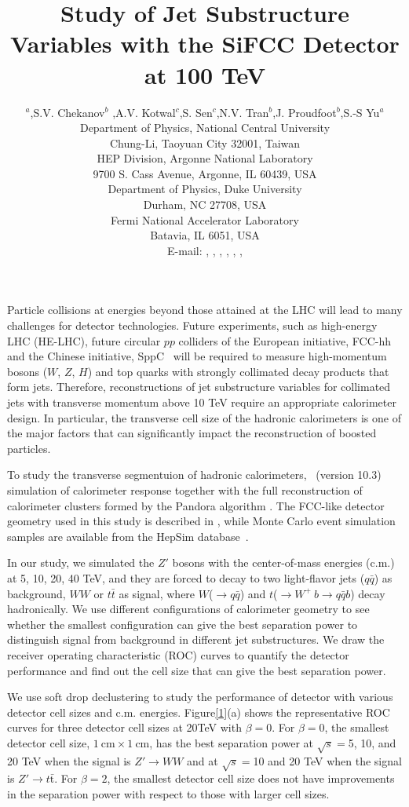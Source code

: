 \documentclass[a4paper]{PoS}
\title{Study of Jet Substructure Variables with the SiFCC Detector at 100 TeV}
\author{\speaker{Chih-Hsiang Yeh}$^a$,S.V. Chekanov$^b$ ,A.V. Kotwal$^{c}$,S. Sen$^{c}$,N.V. Tran$^{b}$,J. Proudfoot$^{b}$,S.-S Yu$^{a}$\\     
     \llap{$^a$}Department of Physics, National Central University\\
     Chung-Li, Taoyuan City 32001, Taiwan\\
     \llap{$^b$}HEP Division, Argonne National Laboratory\\
     9700 S. Cass Avenue, Argonne, IL 60439, USA\\
     \llap{$^c$}Department of Physics, Duke University\\
     Durham, NC 27708, USA\\
     \llap{$^d$}Fermi National Accelerator Laboratory\\
     Batavia, IL 6051, USA\\
     E-mail:  \email{a9510130375@gmail.com},
     \email{chekanov@anl.gov},
     \email{kotwal@phy.duke.edu},
     \email{sourav.sen@duke.edu},
     \email{ntran@fnal.gov},
     \email{proudfoot@anl.gov},
     \email{syu@phy.ncu.edu.tw}}
\begin{document}
Particle collisions at energies  beyond those attained at the LHC will lead to many 
challenges for detector technologies.
Future experiments, such as high-energy LHC (HE-LHC),
future circular $pp$ colliders of the European initiative, FCC-hh~\cite{Benedikt:2206376} and the Chinese initiative, SppC~\cite{Tang:2015qga} will be required to measure high-momentum bosons ($W$, $Z$, $H$) and top quarks with strongly
collimated decay products that form jets.  
Therefore, reconstructions of jet substructure  variables for collimated jets with transverse 
momentum above 10 TeV
require an appropriate calorimeter design.  In particular, the transverse cell size of the hadronic 
calorimeters is one of the major factors that can significantly impact 
the reconstruction of boosted particles.

To study the transverse segmentuion of hadronic calorimeters,
\GEANTfour\ (version 10.3)~\cite{Allison:2016} simulation of calorimeter response together
with
the full reconstruction of calorimeter clusters formed by the Pandora algorithm \cite{Marshall:2013}.
The FCC-like detector geometry used in this study is described in  \cite{Chekanov:2016ppq},
while Monte Carlo event simulation samples are available from the
HepSim database~\cite{Chekanov:2014fga}.


In our study, we simulated the $Z'$ bosons with the center-of-mass energies (c.m.) at 5, 10, 20, 40 TeV, and they are forced to decay to two light-flavor jets ($q\bar{q}$) as background, $W W$ or $t\bar{t}$ as signal, where $W$($\rightarrow$$q\bar{q}$) and $t$($ \rightarrow  W^+\>b \rightarrow q\bar{q} b$) decay hadronically. We use different configurations of calorimeter geometry to see whether the smallest configuration can give the best separation power to distinguish signal from background in different jet substructures. We draw the receiver operating characteristic (ROC) curves to quantify the detector performance and find out the cell size that can give the best separation power.

We use soft drop declustering\cite{Larkoski:2014wba} to study the performance of detector with various detector cell sizes and c.m. energies. Figure\ref{1}(a) shows the representative ROC curves for three detector cell sizes at 20TeV with $\beta=0$. For $\beta=0$, the smallest detector cell size, $1~\mathrm{cm}\times1~\mathrm{cm}$, has the best separation power at $\sqrt{s}=$5, 10, and 20 TeV when the signal is $Z' \rightarrow WW$ and at $\sqrt{s}=$10 and 20 TeV when the signal is $Z' \rightarrow t\bar{\mathrm{t}}$. For $\beta=2$, the smallest detector cell size does not have improvements in the separation power with respect to those with larger cell sizes.
\end{document}
